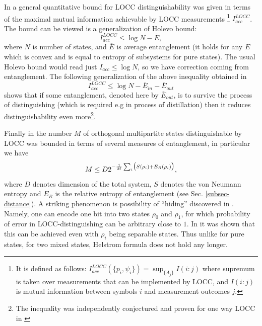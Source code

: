 \documentclass[twocolumn,aps,rmp]{revtex4}
\begin{document}
In \cite{Badziag-Holevo} a general quantitative bound for LOCC distinguishability
was given in terms of the maximal mutual information achievable by LOCC measurements
\footnote{It is defined as follows:
$I_{acc}^{LOCC}(\{p_i,\psi_i\})=\sup_{\{A_j\}}I(i:j)$ where
supremum is taken over measurements that can be implemented by LOCC, and $I(i:j)$
is mutual information between symbols $i$ and measurement outcomes $j$.}  $I^{LOCC}_{acc}$.
The bound can be viewed is a generalization of Holevo bound:
\begin{equation}
I_{acc}^{LOCC} \leq \log N- \overline E,
\end{equation}
where $N$ is number of states, and $\overline E$ is average
entanglement (it holds for any $E$ which is convex and is equal to
entropy of subsystems for pure states).  The usual Holevo bound would
read just $I_{acc}\leq \log N$, so we have correction coming from
entanglement. The following generalization of the above inequality
obtained in \cite{HorodeckiOSS-dist}
\begin{equation}
I_{acc}^{LOCC} \leq \log N-\overline E_{in} -\overline E_{out}
\end{equation}
shows that if some entanglement, denoted here by $\overline E_{out}$,
is to survive the process of distinguishing (which is required e.g in
process of distillation) then it reduces distinguishability
even more\footnote{The inequality was independently
conjectured and proven for one way LOCC in \cite{Ghosh2004-locc-acc}}.

Finally in \cite{HayashiMMOV-LOCCdist} the number $M$ of orthogonal
multipartite states distinguishable by LOCC was bounded in terms of
several measures of entanglement, in particular we have
\begin{equation}
M \leq D 2^{-{1\over M}\sum_i \bigl(S(\rho_i)+E_R(\rho_i)\bigr)},
\label{eq:locc-dist-jap}
\end{equation}
where $D$ denotes dimension of the total system, $S$ denotes the von Neumann entropy and $E_R$ is the relative entropy of entanglement (see Sec. \ref{subsec-distance}).
A striking phenomenon is possibility of ``hiding'' discovered in
\cite{hiding-prl,hiding-ieee}.  Namely, one can encode one bit into
two states $\rho_0$ and $\rho_1$, for which probability of error in
LOCC-distinguishing can be arbitrary close to $1$. In
\cite{WernerHide} it was shown that this can be achieved even with
$\rho_i$ being separable states.  Thus unlike for pure states, for two
mixed states, Helstrom formula does not hold any longer.
\end{document}
